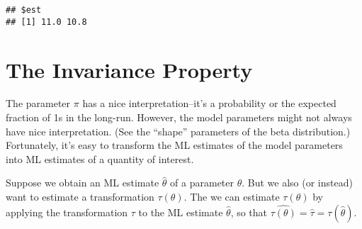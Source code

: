 \documentclass[
]{book}
\newenvironment{Shaded}{\begin{snugshade}}{\end{snugshade}}
\newcommand{\AttributeTok}[1]{\textcolor[rgb]{0.77,0.63,0.00}{#1}}
\newcommand{\CommentTok}[1]{\textcolor[rgb]{0.56,0.35,0.01}{\textit{#1}}}
\newcommand{\ControlFlowTok}[1]{\textcolor[rgb]{0.13,0.29,0.53}{\textbf{#1}}}
\newcommand{\DecValTok}[1]{\textcolor[rgb]{0.00,0.00,0.81}{#1}}
\newcommand{\FunctionTok}[1]{\textcolor[rgb]{0.00,0.00,0.00}{#1}}
\newcommand{\NormalTok}[1]{#1}
\newcommand{\OtherTok}[1]{\textcolor[rgb]{0.56,0.35,0.01}{#1}}
\newcommand{\SpecialCharTok}[1]{\textcolor[rgb]{0.00,0.00,0.00}{#1}}
\newcommand{\StringTok}[1]{\textcolor[rgb]{0.31,0.60,0.02}{#1}}
\begin{document}
\begin{Shaded}
\end{Shaded}

\begin{verbatim}
## $est
## [1] 11.0 10.8
\end{verbatim}

\hypertarget{the-invariance-property}{%
\section{The Invariance Property}\label{the-invariance-property}}

The parameter \(\pi\) has a nice interpretation--it's a probability or
the expected fraction of 1s in the long-run. However, the model
parameters might not always have nice interpretation. (See the ``shape''
parameters of the beta distribution.) Fortunately, it's easy to
transform the ML estimates of the model parameters into ML estimates of
a quantity of interest.

Suppose we obtain an ML estimate \(\hat{\theta}\) of a parameter
\(\theta\). But we also (or instead) want to estimate a transformation
\(\tau(\theta)\). The we can estimate \(\tau(\theta)\) by applying the
transformation \(\tau\) to the ML estimate \(\hat{\theta}\), so that
\(\widehat{\tau(\theta)} = \hat{\tau} = \tau(\hat{\theta})\).
\end{document}
